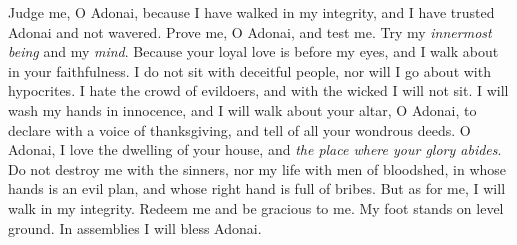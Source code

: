 \begin{biblechapter} %
 Judge me, O Adonai, because I have walked in my integrity, 
and I have trusted Adonai and not wavered.
\verse Prove me, O Adonai, and test me. 
Try my \textit{innermost being} and my \textit{mind}.
\verse Because your loyal love is before my eyes, 
and I walk about in your faithfulness.
\verse I do not sit with deceitful people, 
nor will I go about with hypocrites.
\verse I hate the crowd of evildoers, 
and with the wicked I will not sit.
\verse I will wash my hands in innocence, 
and I will walk about your altar, O Adonai,
\verse to declare with a voice of thanksgiving, 
and tell of all your wondrous deeds.
\verse O Adonai, I love the dwelling of your house, 
and \textit{the place where your glory abides}.
\verse Do not destroy me with the sinners, 
nor my life with men of bloodshed,
\verse in whose hands is an evil plan, 
and whose right hand is full of bribes.
\verse But as for me, I will walk in my integrity. 
Redeem me and be gracious to me.
\verse My foot stands on level ground. 
In assemblies I will bless Adonai.
\end{biblechapter}

